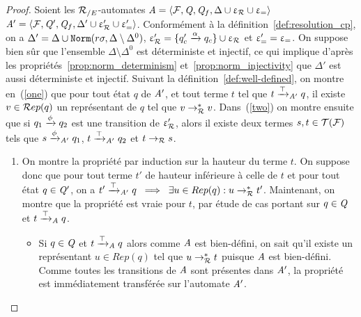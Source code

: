 \begin{proof}
  Soient les ${\mathcal R_{/E}}$-automates $\mathit A=\langle \mathcal{F}, \mathit Q, \mathit Q_f, \Delta\cup \upvarepsilon_{\mathcal R}\cup \upvarepsilon_{=}\rangle$ 
  $\mathit A'=\langle \mathcal{F}, \mathit Q', \mathit Q_f, \Delta'\cup \upvarepsilon_{\mathcal R}'\cup \upvarepsilon_{=}' \rangle$.  Conformément 
  à la définition~\ref{def:resolution_cp}, on a $\Delta'=\Delta \cup
  \mathtt{Norm}(r\sigma, \Delta\setminus \Delta^0)$, $\upvarepsilon_{\mathcal R}'= \{
  q'_c\xrightarrow{\alpha} q_c\}\cup \upvarepsilon_{\mathcal R}$ et $\upvarepsilon_{=}'=\upvarepsilon_{=}$. On suppose bien sûr que l'ensemble $\Delta\setminus\Delta^0$
  est déterministe et injectif, ce qui implique d'après les propriétés~\ref{prop:norm_determinism} et~\ref{prop:norm_injectivity}
  que $\Delta'$ est aussi déterministe et injectif. Suivant la définition~\ref{def:well-defined}, on montre en~(\ref{one}) que 
  pour tout état $q$ de $\mathit A'$, et tout terme $t$ tel que $t \xrightarrow{\top}_{\mathit A'} q$, il existe $v \in \mathcal R ep(q)$ un représentant de $q$ 
  tel que $v \rightarrow^*_\mathcal R v$. Dans~(\ref{two}) on montre ensuite que si $q_1 \xrightarrow{\phi} q_2$ est une transition de $\upvarepsilon_{\mathcal R}'$, alors il 
  existe deux termes $s,t\in \mathcal{T(F)}$ tels que $s\xrightarrow{\phi}_{\mathit A'} q_1$, $t\xrightarrow{\top}_{\mathit A'} q_2$ et $t \rightarrow_\mathcal R s$.
\medskip
  
\begin{enumerate}
\item \label{one} 



  \newcommand{\xrwa}{\xrw{\top}_\A}
  \newcommand{\xrwap}{\xrw{\top}_{\A'}}

  On montre la propriété par induction sur la hauteur du terme $t$. 
  On suppose donc que pour tout terme $t'$ de hauteur inférieure à celle de $t$
  et pour tout état $q\in \mathit Q'$, on a $t' \xrwap q \spf \exists u\in Rep(q): u \rwR^* t'$.
  Maintenant, on montre que la propriété est vraie pour $t$, par étude de cas portant sur $q\in\mathit Q$ et $t\xrwa q$.

  \begin{itemize}
  \item Si $q\in\mathit Q$ et $t\xrwa q$ alors comme $\mathit A$ est bien-défini, on sait qu'il 
    existe un représentant $u\in Rep(q)$ tel que $u\rightarrow_\mathcal R^* t$ puisque $\mathit A$ est bien-défini.
    Comme toutes les transitions de $\mathit A$ sont présentes dans $\mathit A'$, la propriété est immédiatement transférée
    sur l'automate $\mathit A'$.


\end{itemize}
\end{enumerate}
\end{proof}

